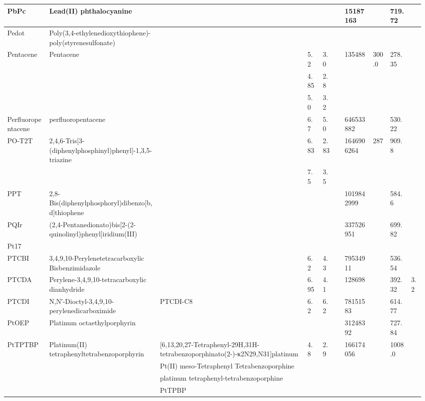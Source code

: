 \documentclass{article}
\begin{document}
\begin{landscape}
\begin{longtable}{| p{} | p{} | p{} | p{} | p{} | p{} | p{} | p{} | p{} | p{} | }
 \hline 
PbPc & Lead(II) phthalocyanine &  &  &  &  & 15187163 &  & 719.72 &  \\ 
 
 \hline 
Pedot & Poly(3,4-ethylenedioxythiophene)-poly(styrenesulfonate) &  &  &  &  &  &  &  &  \\ 
 
 \hline 
Pentacene & Pentacene &  & 5.2 & 3.0 &  & 135488 & 300.0 & 278.35 &  \\ 
 & &  & 4.85 & 2.8 &  &  & & & \\ 
 & &  & 5.0 & 3.2 &  &  & & & \\ 
 
 \hline 
Perfluoropentacene & perfluoropentacene &  & 6.7 & 5.0 &  & 646533882 &  & 530.22 &  \\ 
 
 \hline 
PO-T2T & 2,4,6-Tris[3-(diphenylphosphinyl)phenyl]-1,3,5-triazine &  & 6.83 & 2.83 &  & 1646906264 & 287 & 909.8 &  \\ 
 & &  & 7.5 & 3.5 &  &  & & & \\ 
 
 \hline 
PPT & 2,8-Bis(diphenylphosphoryl)dibenzo[b,d]thiophene &  &  &  &  & 1019842999 &  & 584.6 &  \\ 
 
 \hline 
PQIr & (2,4-Pentanedionato)bis[2-(2-quinolinyl)phenyl]iridium(III) &  &  &  &  & 337526951 &  & 699.82 &  \\ 
 
 \hline 
Pt17 &  &  &  &  &  &  &  &  &  \\ 
 
 \hline 
PTCBI & 3,4,9,10-Perylenetetracarboxylic Bisbenzimidazole  &  & 6.2 & 4.3 &  & 79534911 &  & 536.54 &  \\ 
 
 \hline 
PTCDA & Perylene-3,4,9,10-tetracarboxylic dianhydride &  & 6.95 & 4.1 &  & 128698 &  & 392.32 & 3.2 \\ 
 
 \hline 
PTCDI & N,N′-Dioctyl-3,4,9,10-perylenedicarboximide & PTCDI-C8 & 6.2 & 6.2 &  & 78151583 &  & 614.77 &  \\ 
 
 \hline 
PtOEP & Platinum octaethylporphyrin &  &  &  &  & 31248392 &  & 727.84 &  \\ 
 
 \hline 
PtTPTBP & Platinum(II) tetraphenyltetrabenzoporphyrin & [6,13,20,27-Tetraphenyl-29H,31H-tetrabenzoporphinato(2-)-κ2N29,N31]platinum & 4.8 & 2.9 &  & 166174056 &  & 1008.0 &  \\ 
 & & Pt(II) meso-Tetraphenyl Tetrabenzoporphine &  &  &  &  & & & \\ 
 & & platinum tetraphenyl-tetrabenzoporphine &  &  &  &  & & & \\ 
 & & PtTPBP &  &  &  &  & & & \\ 
 

\end{longtable}
\end{landscape}
\end{document}
